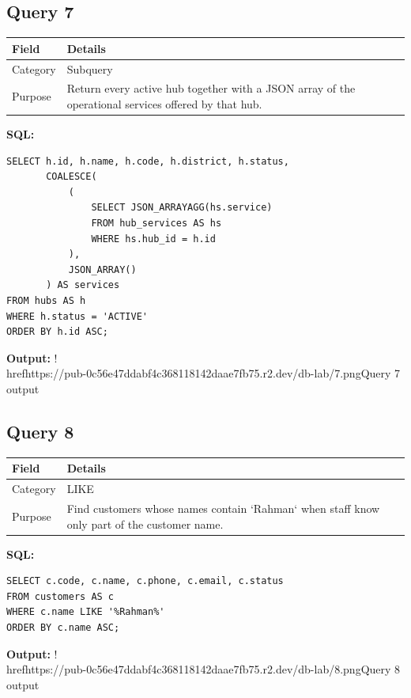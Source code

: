 \documentclass[11pt,a4paper]{article}
\begin{document}
\subsection{Query 7}
\begin{tabularx}{\linewidth}{>{\raggedright\arraybackslash}X|>{\raggedright\arraybackslash}X}
\hline
\textbf{Field} & \textbf{Details} \\ 
\hline
Category & Subquery \\ 
\hline
Purpose & Return every active hub together with a JSON array of the operational services offered by that hub. \\ 
\hline
\end{tabularx}
\textbf{SQL:}
\begin{lstlisting}
SELECT h.id, h.name, h.code, h.district, h.status,
       COALESCE(
           (
               SELECT JSON_ARRAYAGG(hs.service)
               FROM hub_services AS hs
               WHERE hs.hub_id = h.id
           ),
           JSON_ARRAY()
       ) AS services
FROM hubs AS h
WHERE h.status = 'ACTIVE'
ORDER BY h.id ASC;
\end{lstlisting}
\textbf{Output:}
!\\href{https://pub-0c56e47ddabf4c368118142daae7fb75.r2.dev/db-lab/7.png}{Query 7 output}
\subsection{Query 8}
\begin{tabularx}{\linewidth}{>{\raggedright\arraybackslash}X|>{\raggedright\arraybackslash}X}
\hline
\textbf{Field} & \textbf{Details} \\ 
\hline
Category & LIKE \\ 
\hline
Purpose & Find customers whose names contain `Rahman` when staff know only part of the customer name. \\ 
\hline
\end{tabularx}
\textbf{SQL:}
\begin{lstlisting}
SELECT c.code, c.name, c.phone, c.email, c.status
FROM customers AS c
WHERE c.name LIKE '%Rahman%'
ORDER BY c.name ASC;
\end{lstlisting}
\textbf{Output:}
!\\href{https://pub-0c56e47ddabf4c368118142daae7fb75.r2.dev/db-lab/8.png}{Query 8 output}
\end{document}
